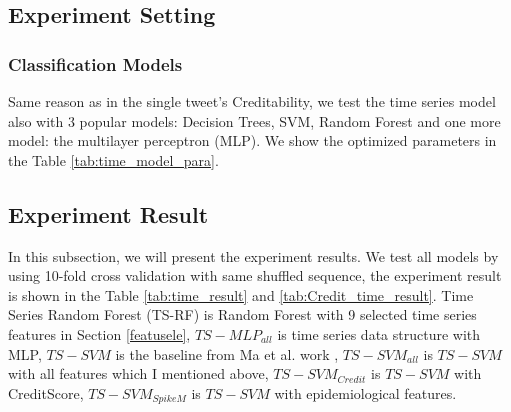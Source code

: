 \subsection{Experiment Setting } 
\label{cha:Data_Collection}


 \subsubsection{Classification Models } 
Same reason as in the single tweet's Creditability, we test the time series model also with 3 popular models: Decision Trees, SVM,  Random Forest and one more model: the multilayer perceptron (MLP). We show the optimized parameters in the Table \ref{tab:time_model_para}.  

\begin{table}[!h]
 \centering
{}
 \caption{Parameters of Classification models}
 \label{tab:time_model_para}
\end{table}


 
  \subsection{Experiment Result} 
 In this subsection, we will present the experiment results. We test all models by using 10-fold cross validation with same shuffled sequence, the experiment result is shown in the Table \ref{tab:time_result} and \ref{tab:Credit_time_result}. Time Series Random Forest (TS-RF) is Random Forest with 9 selected time series features in Section \ref{featusele}, $TS-MLP_{all}$ is time series data structure with MLP, $TS-SVM$ is the baseline from Ma et al. work \cite{ma2015detect}, $TS-SVM_{all}$ is $TS-SVM$ with all features which I mentioned above, $TS-SVM_{Credit}$ is $TS-SVM$ with CreditScore, $TS-SVM_{SpikeM}$ is $TS-SVM$ with epidemiological features.
  
